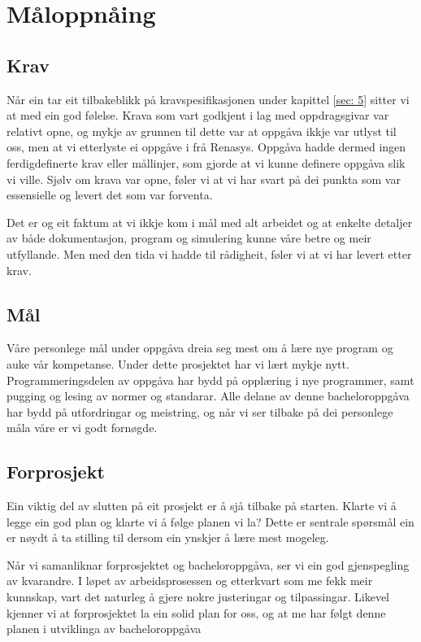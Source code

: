 \section{Måloppnåing}
\thispagestyle{fancy}

\subsection{Krav}
Når ein tar eit tilbakeblikk på kravspesifikasjonen under kapittel \ref{sec: 5} sitter vi at med ein god følelse.
Krava som vart godkjent i lag med oppdragsgivar var relativt opne, og 
mykje av grunnen til dette var at oppgåva ikkje var utlyst til oss, men at vi etterlyste ei oppgåve i frå \gls{Renasys}.
Oppgåva hadde dermed ingen ferdigdefinerte krav eller mållinjer, som gjorde at vi kunne definere oppgåva slik vi ville.
Sjølv om krava var opne, føler vi at vi har svart på dei punkta som var essensielle og levert det som var forventa.

Det er og eit faktum at vi ikkje kom i mål med alt arbeidet og at enkelte detaljer av både dokumentasjon, program og simulering
kunne våre betre og meir utfyllande. Men med den tida vi hadde til rådigheit, føler vi at vi har levert etter krav.

\subsection{Mål}
Våre personlege mål under oppgåva dreia seg mest om å lære nye program og auke vår kompetanse. Under dette prosjektet har vi lært mykje nytt. 
Programmeringsdelen av oppgåva har bydd på opplæring i nye programmer, samt pugging og lesing av normer og standarar.
Alle delane av denne bacheloroppgåva har bydd på utfordringar og meistring, og når vi ser tilbake på dei personlege måla våre er vi godt fornøgde.

\subsection{Forprosjekt}
Ein viktig del av slutten på eit prosjekt er å sjå tilbake på starten.
Klarte vi å legge ein god plan og klarte vi å følge planen vi la?
Dette er sentrale spørsmål ein er nøydt å ta stilling til dersom ein ynskjer å lære mest mogeleg.

Når vi samanliknar forprosjektet og bacheloroppgåva, ser vi ein god gjenspegling av kvarandre. 
I løpet av arbeidsprosessen og etterkvart som me fekk meir kunnskap, vart det naturleg å gjere nokre justeringar og tilpassingar. 
Likevel kjenner vi at forprosjektet la ein solid plan for oss, og at me har følgt denne planen i utviklinga av bacheloroppgåva



\newpage